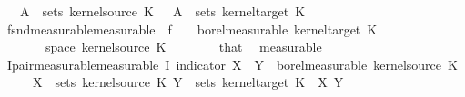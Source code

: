 \begin{isabellebody}
\ \ \ {\isacharquery}{\kern0pt}A\ {\isacharequal}{\kern0pt}\ {\isachardoublequoteopen}sets\ {\isacharparenleft}{\kern0pt}kernel{\isacharunderscore}{\kern0pt}source\ K{\isacharparenright}{\kern0pt}{\isachardoublequoteclose}\ \ \ {\isacharquery}{\kern0pt}A\ {\isacharequal}{\kern0pt}\ {\isachardoublequoteopen}sets\ {\isacharparenleft}{\kern0pt}kernel{\isacharunderscore}{\kern0pt}target\ K{\isacharparenright}{\kern0pt}{\isachardoublequoteclose}\isanewline
\ \ \isamarkupfalse%
\ f{\isacharunderscore}{\kern0pt}snd{\isacharunderscore}{\kern0pt}measurable{\isacharbrackleft}{\kern0pt}measurable{\isacharbrackright}{\kern0pt}{\isacharcolon}{\kern0pt}\ {\isachardoublequoteopen}{\isacharparenleft}{\kern0pt}{\isasymlambda}{\isasymomega}\ f\ {\isacharparenleft}{\kern0pt}{\isasymomega}\ {\isasymomega}\ {\isasymin}\ borel{\isacharunderscore}{\kern0pt}measurable\ {\isacharparenleft}{\kern0pt}kernel{\isacharunderscore}{\kern0pt}target\ K{\isacharparenright}{\kern0pt}{\isachardoublequoteclose}\isanewline
\ \ \ \ \ {\isachardoublequoteopen}{\isasymomega}\ {\isasymin}\ space\ {\isacharparenleft}{\kern0pt}kernel{\isacharunderscore}{\kern0pt}source\ K{\isacharparenright}{\kern0pt}{\isachardoublequoteclose}\ \ {\isasymomega}\isanewline
\ \ \ \ \isamarkupfalse%
\ that\ \isamarkupfalse%
\ measurable\isanewline
\ \ \isamarkupfalse%
\ I{\isacharunderscore}{\kern0pt}pair{\isacharunderscore}{\kern0pt}measurable{\isacharbrackleft}{\kern0pt}measurable{\isacharbrackright}{\kern0pt}{\isacharcolon}{\kern0pt}\ {\isachardoublequoteopen}I\ {\isacharparenleft}{\kern0pt}indicator\ {\isacharparenleft}{\kern0pt}X\ {\isasymtimes}\ Y{\isacharparenright}{\kern0pt}{\isacharparenright}{\kern0pt}\ {\isasymin}\ borel{\isacharunderscore}{\kern0pt}measurable\ {\isacharparenleft}{\kern0pt}kernel{\isacharunderscore}{\kern0pt}source\ K{\isacharparenright}{\kern0pt}{\isachardoublequoteclose}\isanewline
\ \ \ \ \ {\isachardoublequoteopen}X\ {\isasymin}\ sets\ {\isacharparenleft}{\kern0pt}kernel{\isacharunderscore}{\kern0pt}source\ K{\isacharparenright}{\kern0pt}{\isachardoublequoteclose}\ {\isachardoublequoteopen}Y\ {\isasymin}\ sets\ {\isacharparenleft}{\kern0pt}kernel{\isacharunderscore}{\kern0pt}target\ K{\isacharparenright}{\kern0pt}{\isachardoublequoteclose}\ \ X\ Y\isanewline

\end{isabellebody}
